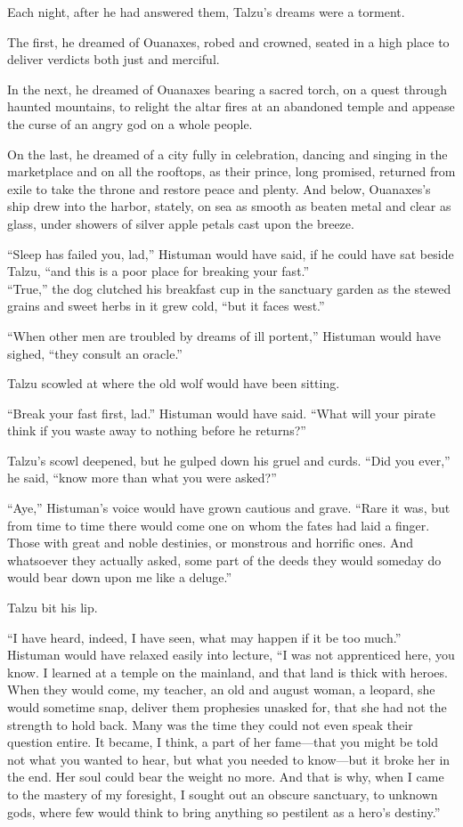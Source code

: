 Each night, after he had answered them, Talzu's dreams were a torment.

The first, he dreamed of Ouanaxes, robed and crowned, seated in a high place to deliver verdicts both just and merciful.

In the next, he dreamed of Ouanaxes bearing a sacred torch, on a quest through haunted mountains, to relight the altar fires at an abandoned temple and appease the curse of an angry god on a whole people.

On the last, he dreamed of a city fully in celebration, dancing and singing in the marketplace and on all the rooftops, as their prince, long promised, returned from exile to take the throne and restore peace and plenty. And below, Ouanaxes's ship drew into the harbor, stately, on sea as smooth as beaten metal and clear as glass, under showers of silver apple petals cast upon the breeze.

``Sleep has failed you, lad,'' Histuman would have said, if he could have sat beside Talzu, ``and this is a poor place for breaking your fast.''\\
``True,'' the dog clutched his breakfast cup in the sanctuary garden as the stewed grains and sweet herbs in it grew cold, ``but it faces west.''

``When other men are troubled by dreams of ill portent,'' Histuman would have sighed, ``they consult an oracle.''

Talzu scowled at where the old wolf would have been sitting.

``Break your fast first, lad.'' Histuman would have said. ``What will your pirate think if you waste away to nothing before he returns?''

Talzu's scowl deepened, but he gulped down his gruel and curds. ``Did you ever,'' he said, ``know more than what you were asked?''

``Aye,'' Histuman's voice would have grown cautious and grave. ``Rare it was, but from time to time there would come one on whom the fates had laid a finger. Those with great and noble destinies, or monstrous and horrific ones. And whatsoever they actually asked, some part of the deeds they would someday do would bear down upon me like a deluge.''

Talzu bit his lip.

``I have heard, indeed, I have seen, what may happen if it be too much.'' Histuman would have relaxed easily into lecture, ``I was not apprenticed here, you know. I learned at a temple on the mainland, and that land is thick with heroes. When they would come, my teacher, an old and august woman, a leopard, she would sometime snap, deliver them prophesies unasked for, that she had not the strength to hold back. Many was the time they could not even speak their question entire. It became, I think, a part of her fame---that you might be told not what you wanted to hear, but what you needed to know---but it broke her in the end. Her soul could bear the weight no more. And that is why, when I came to the mastery of my foresight, I sought out an obscure sanctuary, to unknown gods, where few would think to bring anything so pestilent as a hero's destiny.''

